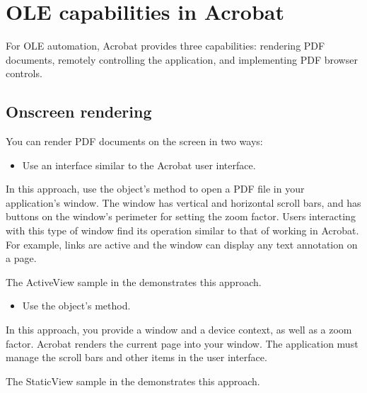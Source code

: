 \documentclass[letterpaper,12pt,english,openany,oneside]{sphinxmanual}
\begin{document}
\section{OLE capabilities in Acrobat}
\label{\detokenize{IAC_DevApp_OLE_Support:ole-capabilities-in-acrobat}}
For OLE automation, Acrobat provides three capabilities: rendering PDF documents, remotely controlling the application, and implementing PDF browser controls.


\subsection{On\sphinxhyphen{}screen rendering}
\label{\detokenize{IAC_DevApp_OLE_Support:on-screen-rendering}}
You can render PDF documents on the screen in two ways:
\begin{itemize}
\item {} 
Use an interface similar to the Acrobat user interface.

\end{itemize}

In this approach, use the  object’s  method to open a PDF file in your application’s window. The window has vertical and horizontal scroll bars, and has buttons on the window’s perimeter for setting the zoom factor. Users interacting with this type of window find its operation similar to that of working in Acrobat. For example, links are active and the window can display any text annotation on a page.

The ActiveView sample in the  demonstrates this approach.
\begin{itemize}
\item {} 
Use the  object’s  method.

\end{itemize}

In this approach, you provide a window and a device context, as well as a zoom factor. Acrobat renders the current page into your window. The application must manage the scroll bars and other items in the user interface.

The StaticView sample in the  demonstrates this approach.
\end{document}
